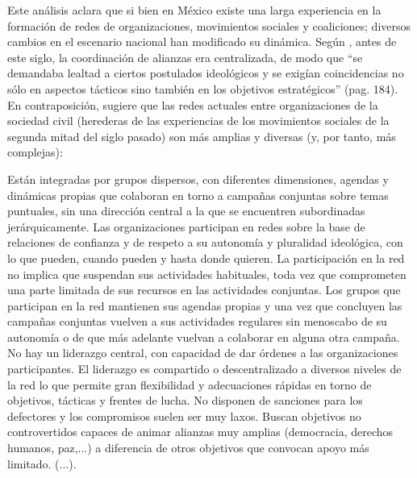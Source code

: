 \documentclass[letterpaper, 11pt]{book}
\theoremstyle{definition}
\theoremstyle{remark}
\begin{document}
Este análisis aclara que si bien en México existe una larga experiencia en la formación de redes de organizaciones, movimientos sociales y coaliciones; diversos cambios en el escenario nacional han modificado su dinámica. 
Según \citet{2015_Cadena_Redes}, antes de este siglo, la coordinación de alianzas era centralizada, de modo que ``se demandaba lealtad a ciertos postulados ideológicos y se exigían coincidencias no sólo en aspectos tácticos sino también en los objetivos estratégicos'' (pag. 184). 
En contraposición, sugiere que las redes actuales entre organizaciones de la sociedad civil (herederas de las experiencias de los movimientos sociales de la segunda mitad del siglo pasado) son más amplias y diversas (y, por tanto, más complejas): 


\begin{center}
    \begin{minipage}{0.9\linewidth}
        {\setlength{\parindent}{12pt}\small
         Están integradas por grupos dispersos, con diferentes dimensiones, agendas y dinámicas propias que colaboran en torno a campañas conjuntas sobre temas puntuales, sin una dirección central a la que se encuentren subordinadas jerárquicamente. 
         Las organizaciones participan en redes sobre la base de relaciones de confianza y de respeto a su autonomía y pluralidad ideológica, con lo que pueden, cuando pueden y hasta donde quieren. 
         La participación en la red no implica que suspendan sus actividades habituales, toda vez que comprometen una parte limitada de sus recursos en las actividades conjuntas. 
         Los grupos que participan en la red mantienen sus agendas propias y una vez que concluyen las campañas conjuntas vuelven a sus actividades regulares sin menoscabo de su autonomía o de que más adelante vuelvan a colaborar en alguna otra campaña. 
         No hay un liderazgo central, con capacidad de dar órdenes a las organizaciones participantes. 
         El liderazgo es compartido o descentralizado a diversos niveles de la red lo que permite gran flexibilidad y adecuaciones rápidas en torno de objetivos, tácticas y frentes de lucha. 
         No disponen de sanciones para los defectores y los compromisos suelen ser muy laxos. 
         Buscan objetivos no controvertidos capaces de animar alianzas muy amplias (democracia, derechos humanos, paz,...) a diferencia de otros objetivos que convocan apoyo más limitado. (...).
         }
    \end{minipage}
    \begin{minipage}{0.9\linewidth}
        {\setlength{\parindent}{12pt}\small
}
\end{minipage}
\end{center}
\end{document}
